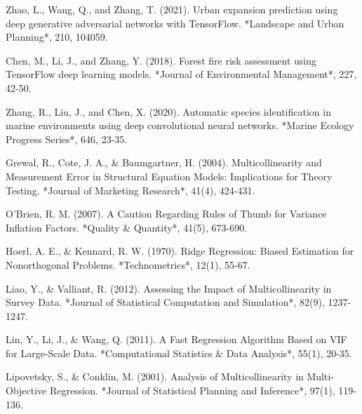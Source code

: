 \documentclass{article}
\begin{document}
\begin{thebibliography}{99}
Zhao, L., Wang, Q., and Zhang, T. (2021). Urban expansion prediction using deep generative adversarial networks with TensorFlow. *Landscape and Urban Planning*, 210, 104059.

Chen, M., Li, J., and Zhang, Y. (2018). Forest fire risk assessment using TensorFlow deep learning models. *Journal of Environmental Management*, 227, 42-50.

Zhang, R., Liu, J., and Chen, X. (2020). Automatic species identification in marine environments using deep convolutional neural networks. *Marine Ecology Progress Series*, 646, 23-35.

Grewal, R., Cote, J. A., \& Baumgartner, H. (2004). Multicollinearity and Measurement Error in Structural Equation Models: Implications for Theory Testing. *Journal of Marketing Research*, 41(4), 424-431.

O'Brien, R. M. (2007). A Caution Regarding Rules of Thumb for Variance Inflation Factors. *Quality \& Quantity*, 41(5), 673-690.

Hoerl, A. E., \& Kennard, R. W. (1970). Ridge Regression: Biased Estimation for Nonorthogonal Problems. *Technometrics*, 12(1), 55-67.

Liao, Y., \& Valliant, R. (2012). Assessing the Impact of Multicollinearity in Survey Data. *Journal of Statistical Computation and Simulation*, 82(9), 1237-1247.

Lin, Y., Li, J., \& Wang, Q. (2011). A Fast Regression Algorithm Based on VIF for Large-Scale Data. *Computational Statistics \& Data Analysis*, 55(1), 20-35.

Lipovetsky, S., \& Conklin, M. (2001). Analysis of Multicollinearity in Multi-Objective Regression. *Journal of Statistical Planning and Inference*, 97(1), 119-136.


\end{thebibliography}
\end{document}
